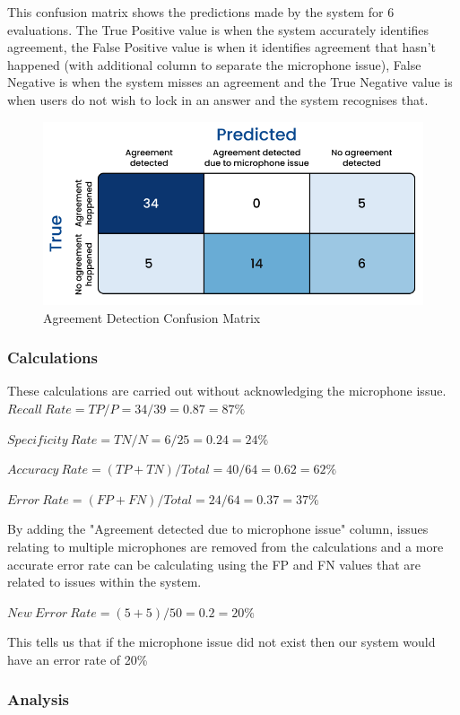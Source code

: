 \documentclass[hidelinks, 11pt]{article}
\begin{document}
This confusion matrix shows the predictions made by the system for 6 evaluations. The True Positive value is when the system accurately identifies agreement, the False Positive value is when it identifies agreement that hasn't happened (with additional column to separate the microphone issue), False Negative is when the system misses an agreement and the True Negative value is when users do not wish to lock in an answer and the system recognises that.
\begin{figure}[!ht]
  \centering
  \includegraphics[width=\columnwidth]{images/agreement_confusion_matrix.png}
  \caption{Agreement Detection Confusion Matrix}
\end{figure}

\subsubsection{Calculations}
These calculations are carried out without acknowledging the microphone issue.
$Recall\:Rate = TP / P = 34 / 39 = 0.87 = 87\%$

$Specificity\:Rate = TN / N = 6 / 25 = 0.24 = 24\%$

$Accuracy\:Rate = (TP + TN) / Total = 40 / 64 = 0.62 = 62\%$

$Error\:Rate = (FP + FN) / Total = 24 / 64 = 0.37 = 37\%$

By adding the "Agreement detected due to microphone issue" column, issues relating to multiple microphones are removed from the calculations and a more accurate error rate can be calculating using the FP and FN values that are related to issues within the system.

$New\:Error\:Rate = (5 + 5) / 50 = 0.2 = 20\%$

This tells us that if the microphone issue did not exist then our system would have an error rate of 20\%
\subsubsection{Analysis}
\end{document}

